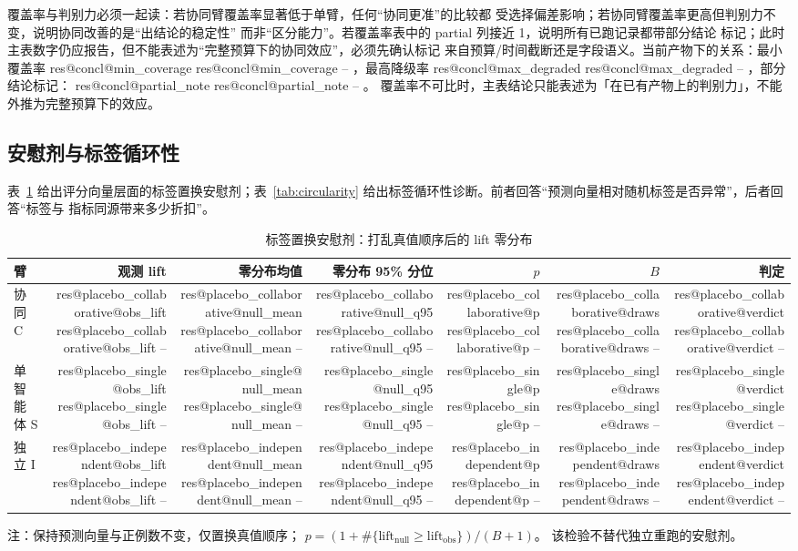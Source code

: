 \documentclass[UTF8,fontset=fandol,11pt,a4paper]{ctexart}
\makeatletter
\newcommand{\RESULT}[2]{%
  \ifcsname res@#1@#2\endcsname
    \csname res@#1@#2\endcsname
  \else
    --%
  \fi}
\makeatother
\begin{document}
覆盖率与判别力必须一起读：若协同臂覆盖率显著低于单臂，任何“协同更准”的比较都
受选择偏差影响；若协同臂覆盖率更高但判别力不变，说明协同改善的是“出结论的稳定性”
而非“区分能力”。若覆盖率表中的 partial 列接近 1，说明所有已跑记录都带部分结论
标记；此时主表数字仍应报告，但不能表述为“完整预算下的协同效应”，必须先确认标记
来自预算/时间截断还是字段语义。当前产物下的关系：最小覆盖率 \RESULT{concl}{min_coverage}，最高降级率
\RESULT{concl}{max_degraded}，部分结论标记：\RESULT{concl}{partial_note}。
覆盖率不可比时，主表结论只能表述为「在已有产物上的判别力」，不能外推为完整预算下的效应。

\subsection{安慰剂与标签循环性}

表~\ref{tab:placebo} 给出评分向量层面的标签置换安慰剂；表~\ref{tab:circularity}
给出标签循环性诊断。前者回答“预测向量相对随机标签是否异常”，后者回答“标签与
指标同源带来多少折扣”。

\begin{table}[t]
\centering
\caption{标签置换安慰剂：打乱真值顺序后的 lift 零分布}
\label{tab:placebo}
\footnotesize
\setlength{\tabcolsep}{4pt}
\begin{tabular}{lrrrrrr}
\toprule
臂 & 观测 lift & 零分布均值 & 零分布 95\% 分位 & $p$ & $B$ & 判定 \\
\midrule
协同 C & \RESULT{placebo_collaborative}{obs_lift} &
\RESULT{placebo_collaborative}{null_mean} & \RESULT{placebo_collaborative}{null_q95} &
\RESULT{placebo_collaborative}{p} & \RESULT{placebo_collaborative}{draws} &
\RESULT{placebo_collaborative}{verdict} \\
单智能体 S & \RESULT{placebo_single}{obs_lift} &
\RESULT{placebo_single}{null_mean} & \RESULT{placebo_single}{null_q95} &
\RESULT{placebo_single}{p} & \RESULT{placebo_single}{draws} &
\RESULT{placebo_single}{verdict} \\
独立 I & \RESULT{placebo_independent}{obs_lift} &
\RESULT{placebo_independent}{null_mean} & \RESULT{placebo_independent}{null_q95} &
\RESULT{placebo_independent}{p} & \RESULT{placebo_independent}{draws} &
\RESULT{placebo_independent}{verdict} \\
\bottomrule
\end{tabular}
\par\smallskip
\raggedright\scriptsize
注：保持预测向量与正例数不变，仅置换真值顺序；
$p=(1+\#\{\mathrm{lift}_{\mathrm{null}}\ge \mathrm{lift}_{\mathrm{obs}}\})/(B+1)$。
该检验不替代独立重跑的安慰剂。
\end{table}
\end{document}
